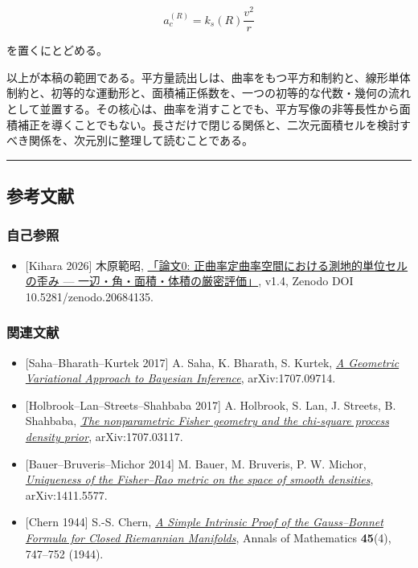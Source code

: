 \documentclass[
]{ltjsarticle}
\providecommand{\tightlist}{%
  \setlength{\itemsep}{0pt}\setlength{\parskip}{0pt}}
\begin{document}
\[
a_c^{(R)}=k_s(R)\frac{v^2}{r}
\]

を置くにとどめる。

以上が本稿の範囲である。平方量読出しは、曲率をもつ平方和制約と、線形単体制約と、初等的な運動形と、面積補正係数を、一つの初等的な代数・幾何の流れとして並置する。その核心は、曲率を消すことでも、平方写像の非等長性から面積補正を導くことでもない。長さだけで閉じる関係と、二次元面積セルを検討すべき関係を、次元別に整理して読むことである。

\begin{center}\rule{0.5\linewidth}{0.5pt}\end{center}

\subsection{参考文献}\label{ux53c2ux8003ux6587ux732e}

\subsubsection{自己参照}\label{ux81eaux5df1ux53c2ux7167}

\begin{itemize}
\tightlist
\item
  {[}Kihara 2026{]} 木原範昭,
  \href{../波長空間と周波数空間の双対幾何/paper0_geodesic_cell_distortion_ja_v1_4.md}{「論文0:
  正曲率定曲率空間における測地的単位セルの歪み ---
  一辺・角・面積・体積の厳密評価」}, v1.4, Zenodo DOI
  10.5281/zenodo.20684135.
\end{itemize}

\subsubsection{関連文献}\label{ux95a2ux9023ux6587ux732e}

\begin{itemize}
\tightlist
\item
  {[}Saha--Bharath--Kurtek 2017{]} A. Saha, K. Bharath, S. Kurtek,
  \href{https://arxiv.org/abs/1707.09714}{\emph{A Geometric Variational
  Approach to Bayesian Inference}}, arXiv:1707.09714.
\item
  {[}Holbrook--Lan--Streets--Shahbaba 2017{]} A. Holbrook, S. Lan, J.
  Streets, B. Shahbaba,
  \href{https://arxiv.org/abs/1707.03117}{\emph{The nonparametric Fisher
  geometry and the chi-square process density prior}}, arXiv:1707.03117.
\item
  {[}Bauer--Bruveris--Michor 2014{]} M. Bauer, M. Bruveris, P. W.
  Michor, \href{https://arxiv.org/abs/1411.5577}{\emph{Uniqueness of the
  Fisher--Rao metric on the space of smooth densities}},
  arXiv:1411.5577.
\item
  {[}Chern 1944{]} S.-S. Chern,
  \href{https://doi.org/10.2307/1969302}{\emph{A Simple Intrinsic Proof
  of the Gauss--Bonnet Formula for Closed Riemannian Manifolds}}, Annals
  of Mathematics \textbf{45}(4), 747--752 (1944).
\end{itemize}
\end{document}
